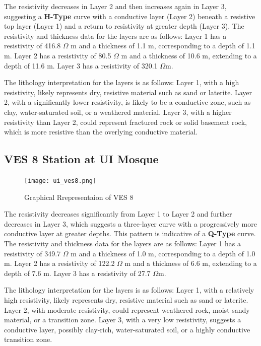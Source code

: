 \documentclass[12pt,a4paper]{report}
\begin{document}
The resistivity decreases in Layer 2 and then increases again in Layer 3, suggesting a \textbf{H-Type} curve with a conductive layer (Layer 2) beneath a resistive top layer (Layer 1) and a return to resistivity at greater depth (Layer 3). The resistivity and thickness data for the layers are as follows: Layer 1 has a resistivity of 416.8 $\Omega$ m and a thickness of 1.1 m, corresponding to a depth of 1.1 m. Layer 2 has a resistivity of 80.5 $\Omega$ m and a thickness of 10.6 m, extending to a depth of 11.6 m. Layer 3 has a resistivity of 320.1 $\Omega$m.

The lithology interpretation for the layers is as follows: Layer 1, with a high resistivity, likely represents dry, resistive material such as sand or laterite. Layer 2, with a significantly lower resistivity, is likely to be a conductive zone, such as clay, water-saturated soil, or a weathered material. Layer 3, with a higher resistivity than Layer 2, could represent fractured rock or solid basement rock, which is more resistive than the overlying conductive material.

\subsection{VES 8 Station at UI Mosque}

\begin{figure}[H]
    \centering
    \texttt{[image: ui\_ves8.png]}
    \caption{Graphical Rrepresentaion of VES 8}
    \label{fig:VES_8_Curve}
\end{figure}

The resistivity decreases significantly from Layer 1 to Layer 2 and further decreases in Layer 3, which suggests a three-layer curve with a progressively more conductive layer at greater depths. This pattern is indicative of a \textbf{Q-Type} curve. The resistivity and thickness data for the layers are as follows: Layer 1 has a resistivity of 349.7 $\Omega$ m and a thickness of 1.0 m, corresponding to a depth of 1.0 m. Layer 2 has a resistivity of 122.2 $\Omega$ m and a thickness of 6.6 m, extending to a depth of 7.6 m. Layer 3 has a resistivity of 27.7 $\Omega$m.

The lithology interpretation for the layers is as follows: Layer 1, with a relatively high resistivity, likely represents dry, resistive material such as sand or laterite. Layer 2, with moderate resistivity, could represent weathered rock, moist sandy material, or a transition zone. Layer 3, with a very low resistivity, suggests a conductive layer, possibly clay-rich, water-saturated soil, or a highly conductive transition zone.
\end{document}
